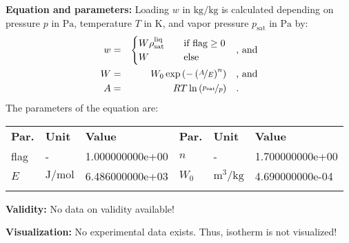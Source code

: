 \textbf{Equation and parameters:}
\newline
%
Loading $w$ in $\si{\kilogram\per\kilogram}$ is calculated depending on pressure $p$ in $\si{\pascal}$, temperature $T$ in $\si{\kelvin}$, and vapor pressure $p_\mathrm{sat}$ in $\si{\pascal}$ by:
%
\begin{equation*}
\begin{split}
w &=& \begin{cases} W \rho_\mathrm{sat}^{\mathrm{liq}} & \quad \text{if flag} \geq 0 \\ W & \quad \text{else} \end{cases} & \quad\text{, and} \\
W &=& W_0 \exp \left( - \left( \nicefrac{A}{E} \right) ^{n} \right) & \quad\text{, and} \\
A &=& R T \ln \left( \nicefrac{p_\mathrm{sat}}{p} \right) & \quad\text{.} \\
\end{split}
\end{equation*}
%
The parameters of the equation are:
%
\begin{longtable}[l]{lll|lll}
\toprule
\addlinespace
\textbf{Par.} & \textbf{Unit} & \textbf{Value} &	\textbf{Par.} & \textbf{Unit} & \textbf{Value} \\
\addlinespace
\midrule
\endhead

\bottomrule
\endfoot
\bottomrule
\endlastfoot
\addlinespace

flag & - & 1.000000000e+00 & $n$ & - & 1.700000000e+00 \\
$E$ & $\si{\joule\per\mole}$ & 6.486000000e+03 & $W_0$ & $\si{\cubic\meter\per\kilogram}$ & 4.690000000e-04 \\

\addlinespace\end{longtable}

\textbf{Validity:}
\newline
No data on validity available!
\newline

\textbf{Visualization:}
%
\newline
No experimental data exists. Thus, isotherm is not visualized!
%

\FloatBarrier
\newpage
